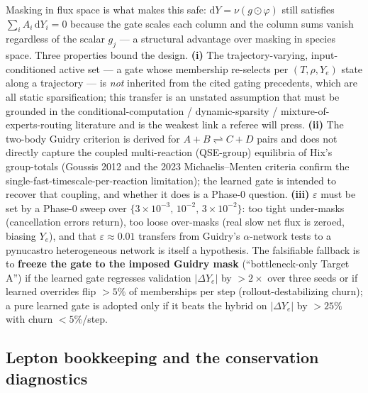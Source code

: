 \documentclass[11pt]{article}
\newcommand{\Ye}{Y_{e}}
\newcommand{\dYe}{\Delta Y_{e}}
\newcommand{\dd}{\mathrm{d}}
\begin{document}
Masking in flux space is what makes this safe: $\dd Y = \nu(g\odot\varphi)$ still satisfies $\sum_i A_i\,\dd Y_i = 0$ because the gate scales each column and the column sums vanish regardless of the scalar $g_j$ --- a structural advantage over masking in species space. Three properties bound the design. \textbf{(i)} The trajectory-varying, input-conditioned active set --- a gate whose membership re-selects per $(T, \rho, \Ye)$ state along a trajectory --- is \emph{not} inherited from the cited gating precedents, which are all static sparsification; this transfer is an unstated assumption that must be grounded in the conditional-computation / dynamic-sparsity / mixture-of-experts-routing literature and is the weakest link a referee will press. \textbf{(ii)} The two-body Guidry criterion is derived for $A{+}B \rightleftharpoons C{+}D$ pairs and does not directly capture the coupled multi-reaction (QSE-group) equilibria of Hix's group-totals (Goussis 2012 and the 2023 Michaelis--Menten criteria confirm the single-fast-timescale-per-reaction limitation); the learned gate is intended to recover that coupling, and whether it does is a Phase-0 question. \textbf{(iii)} $\varepsilon$ must be set by a Phase-0 sweep over $\{3\times10^{-3},\, 10^{-2},\, 3\times10^{-2}\}$: too tight under-masks (cancellation errors return), too loose over-masks (real slow net flux is zeroed, biasing $\Ye$), and that $\varepsilon \approx 0.01$ transfers from Guidry's $\alpha$-network tests to a pynucastro heterogeneous network is itself a hypothesis. The falsifiable fallback is to \textbf{freeze the gate to the imposed Guidry mask} (``bottleneck-only Target A'') if the learned gate regresses validation $|\dYe|$ by $>2\times$ over three seeds or if learned overrides flip $>5\%$ of memberships per step (rollout-destabilizing churn); a pure learned gate is adopted only if it beats the hybrid on $|\dYe|$ by $>25\%$ with churn $<5\%$/step.

\subsection{Lepton bookkeeping and the conservation diagnostics}
\end{document}
